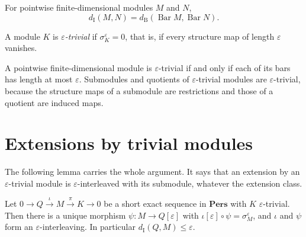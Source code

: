 \documentclass[11pt, twoside]{article}
\newcommand{\Pers}{\mathbf{Pers}}
\newcommand{\sh}[2]{#1[#2]}
\DeclareMathOperator{\Barc}{Bar}
\newcommand{\dI}{d_{\mathrm{I}}}
\newcommand{\dB}{d_{\mathrm{B}}}
\begin{document}
\begin{theorem}
\label{thm:isometry}
For pointwise finite-dimensional modules $M$ and $N$,
\begin{equation}
\label{eq:isometry}
\dI(M,N) = \dB(\Barc M, \Barc N).
\end{equation}
\end{theorem}

\begin{definition}
A module $K$ is \emph{$\varepsilon$-trivial} if $\sigma_K^\varepsilon = 0$,
that is, if every structure map of length $\varepsilon$ vanishes.
\end{definition}

\begin{remark}
\label{rem:trivial}
A pointwise finite-dimensional module is $\varepsilon$-trivial if and only if
each of its bars has length at most $\varepsilon$. Submodules and quotients of
$\varepsilon$-trivial modules are $\varepsilon$-trivial, because the
structure maps of a submodule are restrictions and those of a quotient are
induced maps.
\end{remark}

\section{Extensions by trivial modules}
\label{sec:extensions}

The following lemma carries the whole argument. It says that an extension by
an $\varepsilon$-trivial module is $\varepsilon$-interleaved with its
submodule, whatever the extension class.

\begin{lemma}
\label{lem:extension}
Let $0 \to Q \xrightarrow{\iota} M \xrightarrow{\pi} K \to 0$ be a short exact
sequence in $\Pers$ with $K$ $\varepsilon$-trivial. Then there is a unique
morphism $\psi\colon M \to \sh{Q}{\varepsilon}$ with
$\sh{\iota}{\varepsilon}\circ\psi = \sigma_M^\varepsilon$, and $\iota$ and
$\psi$ form an $\varepsilon$-interleaving. In particular
$\dI(Q, M) \le \varepsilon$.
\end{lemma}
\end{document}
